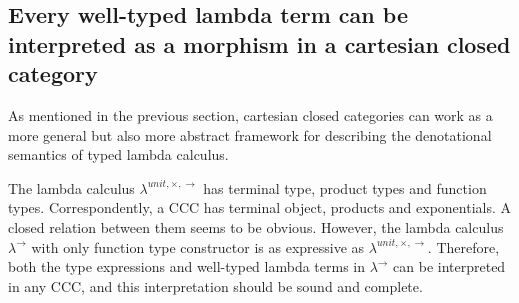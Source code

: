 \clearpage
\subsection{Every well-typed lambda term can be interpreted as a morphism in a cartesian closed category}
\label{sec:co_t2m}
As mentioned in the previous section, cartesian closed categories can work as a more general but also more abstract framework for describing the denotational semantics of typed lambda calculus.

The lambda calculus $ \lambda ^{unit, \times , \to } $ has terminal type, product types and function types. Correspondently, a CCC has terminal object, products and exponentials. A closed relation
between them seems to be obvious. However, the lambda calculus $ \lambda ^ \to $ with only function type constructor is as expressive as $ \lambda ^{unit, \times , \to } $. Therefore, both the type expressions and well-typed lambda terms in $ \lambda ^ \to $ can be interpreted in any CCC, and this interpretation should be sound and complete.

